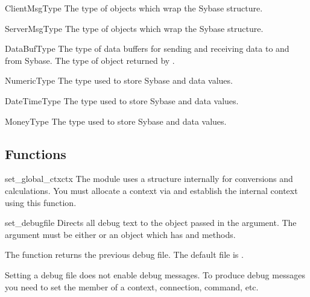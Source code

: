 \begin{datadesc}{ClientMsgType}
The type of  objects which wrap the Sybase
 structure.
\end{datadesc}

\begin{datadesc}{ServerMsgType}
The type of  objects which wrap the Sybase
 structure.
\end{datadesc}

\begin{datadesc}{DataBufType}
The type of data buffers for sending and receiving data to and from
Sybase.  The type of object returned by .
\end{datadesc}

\begin{datadesc}{NumericType}
The type used to store Sybase  and 
data values.
\end{datadesc}

\begin{datadesc}{DateTimeType}
The type used to store Sybase  and
 data values.
\end{datadesc}

\begin{datadesc}{MoneyType}
The type used to store Sybase  and 
data values.
\end{datadesc}

\subsection{Functions}

\begin{funcdesc}{set_global_ctx}{ctx}
The  module uses a  structure
internally for conversions and calculations.  You must allocate a
context via  and establish the internal
context using this function.
\end{funcdesc}

\begin{funcdesc}{set_debug}{file}
Directs all debug text to the object passed in the 
argument.  The  argument must be either  or an
object which has  and  methods.

The function returns the previous debug file.  The default file is
.

Setting a debug file does not enable debug messages.  To produce debug
messages you need to set the  member of a context,
connection, command, etc.
\end{funcdesc}

